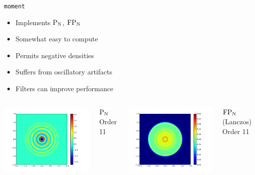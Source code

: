 \documentclass{beamer}
\newcommand{\PN}{\ensuremath{\textnormal{P}_\textnormal{N}}\xspace}
\newcommand{\FPN}{\ensuremath{\textnormal{FP}_\textnormal{N}}\xspace}
\newcommand{\moment}{\texttt{moment}\xspace}
\begin{document}
    \begin{frame}{\moment}
        \begin{itemize}
            \item Implements \PN, \FPN
            \item Somewhat easy to compute
            \item Permits negative densities
            \item Suffers from oscillatory artifacts
            \item Filters can improve performance
        \end{itemize}

        \vfill

        \begin{columns}
            \centering
            \includegraphics[width=\textwidth]{P11-400.pdf}

            \PN Order 11

            \centering
            \includegraphics[width=\textwidth]{FP11-lanczos-400-tune=10.pdf}

            \FPN(Lanczos) Order 11
        \end{columns}
    \end{frame}
\end{document}
